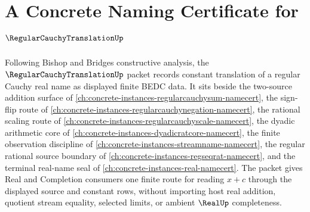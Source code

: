 \chapter{A Concrete Naming Certificate for $\RegularCauchyTranslationUp$}
\label{ch:concrete-instances-regular-cauchy-translation-namecert}

Following Bishop and Bridges constructive analysis, the $\RegularCauchyTranslationUp$ packet records constant translation of a regular Cauchy real name as displayed finite BEDC data. It sits beside the two-source addition surface of \autoref{ch:concrete-instances-regularcauchysum-namecert}, the sign-flip route of \autoref{ch:concrete-instances-regularcauchynegation-namecert}, the rational scaling route of \autoref{ch:concrete-instances-regularcauchyscale-namecert}, the dyadic arithmetic core of \autoref{ch:concrete-instances-dyadicratcore-namecert}, the finite observation discipline of \autoref{ch:concrete-instances-streamname-namecert}, the regular rational source boundary of \autoref{ch:concrete-instances-regseqrat-namecert}, and the terminal real-name seal of \autoref{ch:concrete-instances-real-namecert}. The packet gives Real and Completion consumers one finite route for reading $x+c$ through the displayed source and constant rows, without importing host real addition, quotient stream equality, selected limits, or ambient $\RealUp$ completeness.

